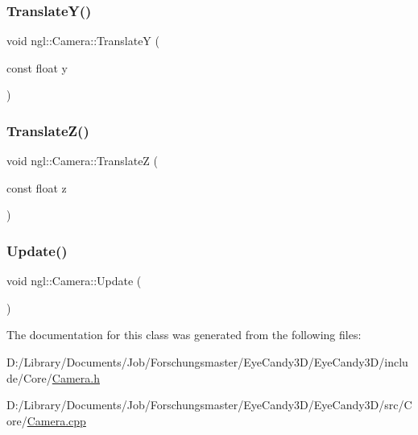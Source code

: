 \subsubsection{\texorpdfstring{Translate\+Y()}{TranslateY()}}
{\footnotesize\ttfamily void ngl\+::\+Camera\+::\+TranslateY (\begin{DoxyParamCaption}\item[{const float}]{y }\end{DoxyParamCaption})}

\mbox{\label{classngl_1_1_camera_a4397c28c84c25c1cb7779907368e5e3f}} 
\subsubsection{\texorpdfstring{Translate\+Z()}{TranslateZ()}}
{\footnotesize\ttfamily void ngl\+::\+Camera\+::\+TranslateZ (\begin{DoxyParamCaption}\item[{const float}]{z }\end{DoxyParamCaption})}

\mbox{\label{classngl_1_1_camera_a35ce10314ff19b5db20a53e3dd1df43a}} 
\subsubsection{\texorpdfstring{Update()}{Update()}}
{\footnotesize\ttfamily void ngl\+::\+Camera\+::\+Update (\begin{DoxyParamCaption}{ }\end{DoxyParamCaption})}



The documentation for this class was generated from the following files\+:\begin{DoxyCompactItemize}
\item 
D\+:/\+Library/\+Documents/\+Job/\+Forschungsmaster/\+Eye\+Candy3\+D/\+Eye\+Candy3\+D/include/\+Core/\mbox{\hyperlink{_camera_8h}{Camera.\+h}}\item 
D\+:/\+Library/\+Documents/\+Job/\+Forschungsmaster/\+Eye\+Candy3\+D/\+Eye\+Candy3\+D/src/\+Core/\mbox{\hyperlink{_camera_8cpp}{Camera.\+cpp}}\end{DoxyCompactItemize}
